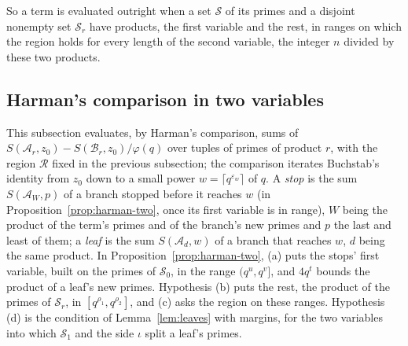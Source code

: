 \documentclass[11pt]{article}
\theoremstyle{definition}
\begin{document}
So a term is evaluated outright when a set $\mathcal S$ of its primes and a disjoint nonempty set $\mathcal S_r$ have
products, the first variable and the rest, in ranges on which the region holds for every length of the second
variable, the integer $n$ divided by these two products.

\subsection{Harman's comparison in two variables}\label{sec:harman}

This subsection evaluates, by Harman's comparison, sums of $S(\mathcal A_r, z_0) - S(\mathcal B_r, z_0)/\varphi(q)$
over tuples of primes of product $r$, with the region $\mathcal R$ fixed in the previous subsection; the comparison
iterates Buchstab's identity \cite{buchstab} from $z_0$ down to a small power $w = \lceil q^{\varepsilon_w} \rceil$ of
$q$. A \emph{stop} is the sum $S(\mathcal A_W, p)$ of a branch stopped before it reaches $w$ (in
Proposition~\ref{prop:harman-two}, once its first variable is in range), $W$ being the product of the term's primes and
of the branch's new primes and $p$ the last and least of them; a \emph{leaf} is the sum $S(\mathcal A_d, w)$ of a
branch that reaches $w$, $d$ being the same product. In Proposition~\ref{prop:harman-two}, (a) puts the stops' first
variable, built on the primes of $\mathcal S_0$, in the range $(q^u, q^v]$, and $4q^t$ bounds the product of a leaf's
new primes. Hypothesis (b) puts the rest, the product of the primes of $\mathcal S_r$, in $[q^{\rho_1}, q^{\rho_2}]$,
and (c) asks the region on these ranges. Hypothesis (d) is the condition of Lemma~\ref{lem:leaves} with margins, for
the two variables into which $\mathcal S_1$ and the side $\iota$ split a leaf's primes.
\end{document}
